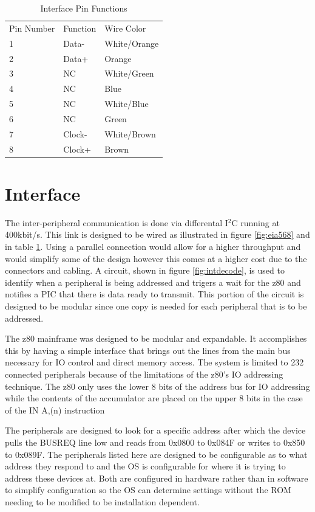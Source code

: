 \documentclass{book}
\begin{document}
\begin{table}
\centering
\begin{tabular}{| l | l | l |}
Pin Number & Function & Wire Color\\
1 & Data- & White/Orange\\
2 & Data+ & Orange\\
3 & NC & White/Green\\
4 & NC & Blue\\
5 & NC & White/Blue\\
6 & NC & Green\\
7 & Clock- & White/Brown\\
8 & Clock+ & Brown\\
\end{tabular}
\caption{Interface Pin Functions\label{tab:intpin}}
\end{table}
\section{Interface}
The inter-peripheral communication is done via differental I$^2$C running at 400kbit/s. This link is designed to be wired as illustrated in figure \ref{fig:eia568} and in table \ref{tab:intpin}. Using a parallel connection would allow for a higher throughput and would simplify some of the design however this comes at a higher cost due to the connectors and cabling. A circuit, shown in figure \ref{fig:intdecode}, is used to identify when a peripheral is being addressed and trigers a wait for the z80 and notifies a PIC that there is data ready to transmit. This portion of the circuit is designed to be modular since one copy is needed for each peripheral that is to be addressed. 

The z80 mainframe was designed to be modular and expandable. It accomplishes this by having a simple interface that brings out the lines from the main bus necessary for IO control and direct memory access. The system is limited to 232 connected peripherals because of the limitations of the z80's IO addressing technique. The z80 only uses the lower 8 bits of the address bus for IO addressing while the contents of the accumulator are placed on the upper 8 bits in the case of  the IN A,(n) instruction\cite[p.~295]{zlg:z80}

The peripherals  are designed to look for a specific address after which the device pulls the BUSREQ line low and reads from 0x0800 to 0x084F or writes to 0x850 to 0x089F. The peripherals listed here are designed to be configurable as to what address they respond to and the OS is configurable for where it is trying to address these devices at. Both are configured in hardware rather than in software to simplify configuration so the OS can determine settings without the ROM needing to be modified to be installation dependent.
\end{document}

